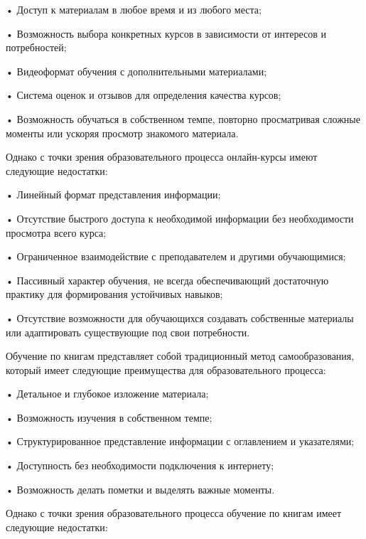 {  \par \redline • Доступ к материалам в любое время и из любого места;
  \par \redline • Возможность выбора конкретных курсов в зависимости от интересов и потребностей;
  \par \redline • Видеоформат обучения с дополнительными материалами;
  \par \redline • Система оценок и отзывов для определения качества курсов;
  \par \redline • Возможность обучаться в собственном темпе, повторно просматривая сложные моменты или ускоряя просмотр знакомого материала.
  
  \par \redline Однако с точки зрения образовательного процесса онлайн-курсы имеют следующие недостатки:
  
  \par \redline • Линейный формат представления информации;
  \par \redline • Отсутствие быстрого доступа к необходимой информации без необходимости просмотра всего курса;
  \par \redline • Ограниченное взаимодействие с преподавателем и другими обучающимися;
  \par \redline • Пассивный характер обучения, не всегда обеспечивающий достаточную практику для формирования устойчивых навыков;
  \par \redline • Отсутствие возможности для обучающихся создавать собственные материалы или адаптировать существующие под свои потребности.

  \par \redline Обучение по книгам представляет собой традиционный метод самообразования, который имеет следующие преимущества для образовательного процесса:
  
  \par \redline • Детальное и глубокое изложение материала;
  \par \redline • Возможность изучения в собственном темпе;
  \par \redline • Структурированное представление информации с оглавлением и указателями;
  \par \redline • Доступность без необходимости подключения к интернету;
  \par \redline • Возможность делать пометки и выделять важные моменты.
  
  \par \redline Однако с точки зрения образовательного процесса обучение по книгам имеет следующие недостатки:
  
}
